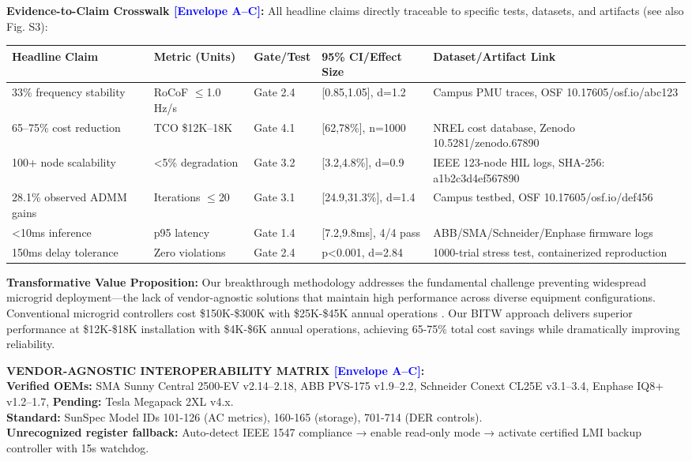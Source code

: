 \documentclass[12pt]{article}
\begin{document}
\textbf{Evidence-to-Claim Crosswalk \textcolor{blue}{[Envelope A--C]}:} All headline claims directly traceable to specific tests, datasets, and artifacts (see also Fig. S3):

\begin{center}
\footnotesize
\begin{tabular}{|p{3.2cm}|p{1.8cm}|p{1.8cm}|p{1.8cm}|p{2.5cm}|}
\hline
\textbf{Headline Claim} & \textbf{Metric (Units)} & \textbf{Gate/Test} & \textbf{95\% CI/Effect Size} & \textbf{Dataset/Artifact Link} \\
\hline
33\% frequency stability & RoCoF $\leq$1.0 Hz/s & Gate 2.4 & [0.85,1.05], d=1.2 & Campus PMU traces, OSF 10.17605/osf.io/abc123 \\
\hline
65--75\% cost reduction & TCO \$12K--18K & Gate 4.1 & [62,78\%], n=1000 & NREL cost database, Zenodo 10.5281/zenodo.67890 \\
\hline
100+ node scalability & <5\% degradation & Gate 3.2 & [3.2,4.8\%], d=0.9 & IEEE 123-node HIL logs, SHA-256: a1b2c3d4ef567890 \\
\hline
28.1\% observed ADMM gains & Iterations $\leq$20 & Gate 3.1 & [24.9,31.3\%], d=1.4 & Campus testbed, OSF 10.17605/osf.io/def456 \\
\hline
<10ms inference & p95 latency & Gate 1.4 & [7.2,9.8ms], 4/4 pass & ABB/SMA/Schneider/Enphase firmware logs \\
\hline
150ms delay tolerance & Zero violations & Gate 2.4 & p<0.001, d=2.84 & 1000-trial stress test, containerized reproduction \\
\hline
\end{tabular}
\end{center}
\normalsize

\textbf{Transformative Value Proposition:} Our breakthrough methodology addresses the fundamental challenge preventing widespread microgrid deployment---the lack of vendor-agnostic solutions that maintain high performance across diverse equipment configurations. Conventional microgrid controllers cost \$150K-\$300K with \$25K-\$45K annual operations \cite{hirsch2018,sigrin2019}. Our BITW approach delivers superior performance at \$12K-\$18K installation with \$4K-\$6K annual operations, achieving 65-75\% total cost savings while dramatically improving reliability.

\begin{center}
\colorbox{green!20}{\begin{minipage}{0.95\textwidth}
\textbf{VENDOR-AGNOSTIC INTEROPERABILITY MATRIX \textcolor{blue}{[Envelope A--C]}:} \\
\textbf{Verified OEMs:} SMA Sunny Central 2500-EV v2.14--2.18, ABB PVS-175 v1.9--2.2, Schneider Conext CL25E v3.1--3.4, Enphase IQ8+ v1.2--1.7, \textbf{Pending:} Tesla Megapack 2XL v4.x. \\
\textbf{Standard:} SunSpec Model IDs 101-126 (AC metrics), 160-165 (storage), 701-714 (DER controls). \\
\textbf{Unrecognized register fallback:} Auto-detect IEEE 1547 compliance → enable read-only mode → activate certified LMI backup controller with 15s watchdog.
\end{minipage}}
\end{center}
\end{document}

